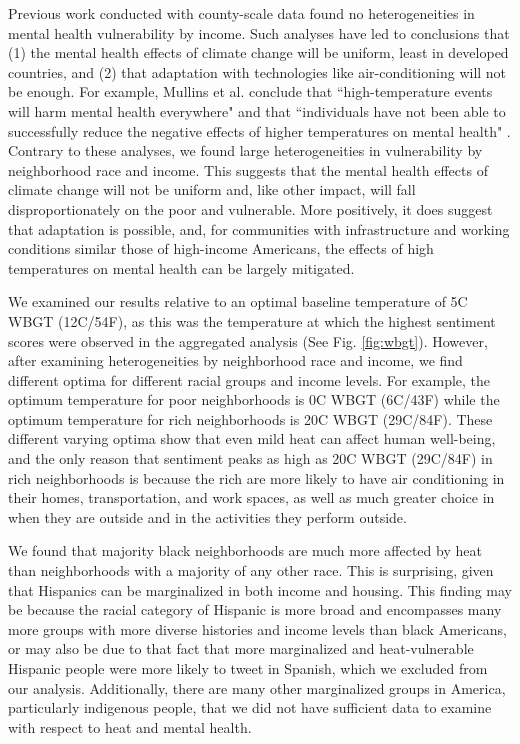 \documentclass{article}
\begin{document}
Previous work conducted with county-scale data found no heterogeneities in mental health vulnerability by income.  Such analyses have led to conclusions that (1) the mental health effects of climate change will be uniform, least in developed countries, and (2) that adaptation with technologies like air-conditioning will not be enough.  For example, Mullins et al. conclude that ``high-temperature events will harm mental health everywhere" and that ``individuals have not been able to successfully reduce the negative effects of higher temperatures on mental health" \cite{Mullins2019Dec}.  Contrary to these analyses, we found large heterogeneities in vulnerability by neighborhood race and income.  This suggests that the mental health effects of climate change will not be uniform and, like other impact, will fall disproportionately on the poor and vulnerable.  More positively, it does suggest that adaptation is possible, and, for communities with infrastructure and working conditions similar those of high-income Americans, the effects of high temperatures on mental health can be largely mitigated.

We examined our results relative to an optimal baseline temperature of 5\textdegree C WBGT (12\textdegree C/54\textdegree F), as this was the temperature at which the highest sentiment scores were observed in the aggregated analysis (See Fig. \ref{fig:wbgt}).  However, after examining heterogeneities by neighborhood race and income, we find different optima for different racial groups and income levels.  For example, the optimum temperature for poor neighborhoods is 0\textdegree C WBGT (6\textdegree C/43\textdegree F) while the optimum temperature for rich neighborhoods is 20\textdegree C WBGT (29\textdegree C/84\textdegree F).  These different varying optima show that even mild heat can affect human well-being, and the only reason that sentiment peaks as high as 20\textdegree C WBGT (29\textdegree C/84\textdegree F) in rich neighborhoods is because the rich are more likely to have air conditioning in their homes, transportation, and work spaces, as well as much greater choice in when they are outside and in the activities they perform outside.

We found that majority black neighborhoods are much more affected by heat than neighborhoods with a majority of any other race.  This is surprising, given that Hispanics can be marginalized in both income and housing.  This finding may be because the racial category of Hispanic is more broad and encompasses many more groups with more diverse histories and income levels than black Americans, or may also be due to that fact that more marginalized and heat-vulnerable Hispanic people were more likely to tweet in Spanish, which we excluded from our analysis.  Additionally, there are many other marginalized groups in America, particularly indigenous people, that we did not have sufficient data to examine with respect to heat and mental health.  
\end{document}
